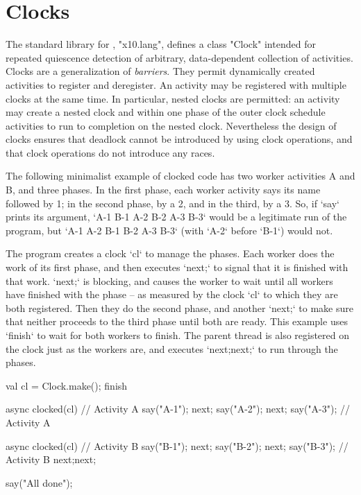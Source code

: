 \chapter{Clocks}\label{XtenClocks}

The standard library for \Xten{}, \xcd"x10.lang", defines a
class \xcd"Clock" intended for repeated quiescence detection
of arbitrary, data-dependent collection of activities. Clocks are a
generalization of {\em barriers}. They permit dynamically created
activities to register and deregister. An activity may be registered
with multiple clocks at the same time. In particular, nested clocks
are permitted: an activity may create a nested clock and within one
phase of the outer clock schedule activities to run to completion on
the nested clock.  Nevertheless the design of clocks ensures that
deadlock cannot be introduced by using clock operations, and that
clock operations do not introduce any races.


The following minimalist example of clocked code has two worker activities A
and B, and three phases. In the first phase, each worker activity says its
name followed by 1; in the second phase, by a 2, and in the third, by a 3.  
So, if \xcd`say` prints its argument, 
\xcd`A-1 B-1 A-2 B-2 A-3 B-3`
would be a legitimate run of the program, but
\xcd`A-1 A-2 B-1 B-2 A-3 B-3`
(with \xcd`A-2` before \xcd`B-1`) would not.

The program creates a clock \xcd`cl` to manage the phases.  Each worker does
the work of its first phase, and then executes \xcd`next;` to signal that it
is finished with that work. \xcd`next;` is blocking, and causes the worker to
wait until all workers have finished with the phase -- as measured by the
clock \xcd`cl` to which they are both registered.  
Then they do the second phase, and another \xcd`next;` to make sure that
neither proceeds to the third phase until both are ready.  This example uses
\xcd`finish` to wait for both workers to finish.  The parent thread is also
registered on the clock just as the workers are, and executes \xcd`next;next;`
to run through the phases.



\begin{xten}
    val cl = Clock.make();
    finish{
      async clocked(cl) {// Activity A
        say("A-1");
        next;
        say("A-2");
        next;
        say("A-3"); 
      }// Activity A

      async clocked(cl) {// Activity B
        say("B-1");
        next;
        say("B-2");
        next;
        say("B-3"); 
      }// Activity B
      next;next;       
    }
    say("All done");

\end{xten}

